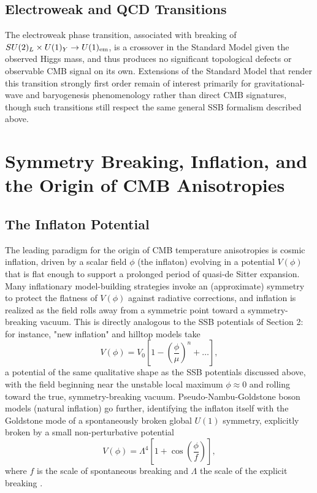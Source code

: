 \documentclass[11pt]{article}
\begin{document}
\subsection{Electroweak and QCD Transitions}

The electroweak phase transition, associated with breaking of $SU(2)_L\times U(1)_Y \to U(1)_{\rm em}$, is a crossover in the Standard Model given the observed Higgs mass, and thus produces no significant topological defects or observable CMB signal on its own. Extensions of the Standard Model that render this transition strongly first order remain of interest primarily for gravitational-wave and baryogenesis phenomenology rather than direct CMB signatures, though such transitions still respect the same general SSB formalism described above.

\section{Symmetry Breaking, Inflation, and the Origin of CMB Anisotropies}

\subsection{The Inflaton Potential}

The leading paradigm for the origin of CMB temperature anisotropies is cosmic inflation, driven by a scalar field $\phi$ (the inflaton) evolving in a potential $V(\phi)$ that is flat enough to support a prolonged period of quasi-de Sitter expansion. Many inflationary model-building strategies invoke an (approximate) symmetry to protect the flatness of $V(\phi)$ against radiative corrections, and inflation is realized as the field rolls away from a symmetric point toward a symmetry-breaking vacuum. This is directly analogous to the SSB potentials of Section 2: for instance, "new inflation" and hilltop models take
\begin{equation}
V(\phi) = V_0 \left[1 - \left(\frac{\phi}{\mu}\right)^n + \ldots \right],
\end{equation}
a potential of the same qualitative shape as the SSB potentials discussed above, with the field beginning near the unstable local maximum $\phi \approx 0$ and rolling toward the true, symmetry-breaking vacuum. Pseudo-Nambu-Goldstone boson models (natural inflation) go further, identifying the inflaton itself with the Goldstone mode of a spontaneously broken global $U(1)$ symmetry, explicitly broken by a small non-perturbative potential
\begin{equation}
V(\phi) = \Lambda^4 \left[1+ \cos\left(\frac{\phi}{f}\right)\right],
\end{equation}
where $f$ is the scale of spontaneous breaking and $\Lambda$ the scale of the explicit breaking \citep{Freese1990}.
\end{document}
